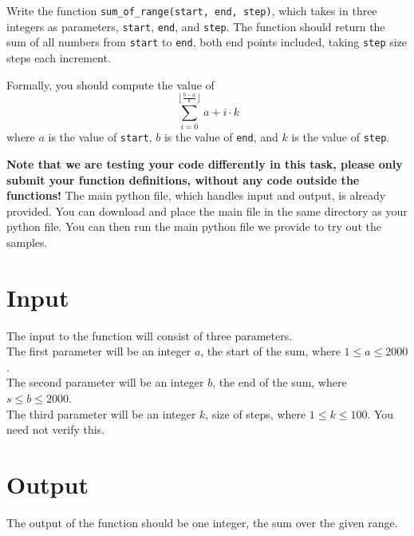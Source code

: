 
Write the function
\texttt{sum\_of\_range(start, end, step)},
which takes in three integers as parameters, 
\texttt{start}, \texttt{end}, and \texttt{step}.
The function should return the sum of
all numbers from \texttt{start} to \texttt{end},
both end points included,
taking \texttt{step} size steps each increment.

Formally, you should compute the value of 
\[
    \sum_{i=0}^{\left \lfloor \frac{b-a}{k} \right \rfloor} a + i \cdot k
\]
where $a$ is the value of \texttt{start},
$b$ is the value of \texttt{end},
and $k$ is the value of \texttt{step}.

\textbf{Note that we are testing your code differently in this task,
please only submit your function definitions, without any code outside the functions!}
The main python file, which handles input and output, is already provided.
You can download and place the main file in the same directory as your python file.
You can then run the main python file we provide to try out the samples.

\section*{Input}
The input to the function will consist of three parameters.\\
The first parameter will be an integer $a$, the start of the sum, where $1 \leq a \leq 2000$.\\
The second parameter will be an integer $b$, the end of the sum, where $s \leq b \leq 2000$.\\
The third parameter will be an integer $k$, size of steps, where $1 \leq k \leq 100$.
You need not verify this.

\section*{Output}
The output of the function should be one integer, the sum over the given range.
